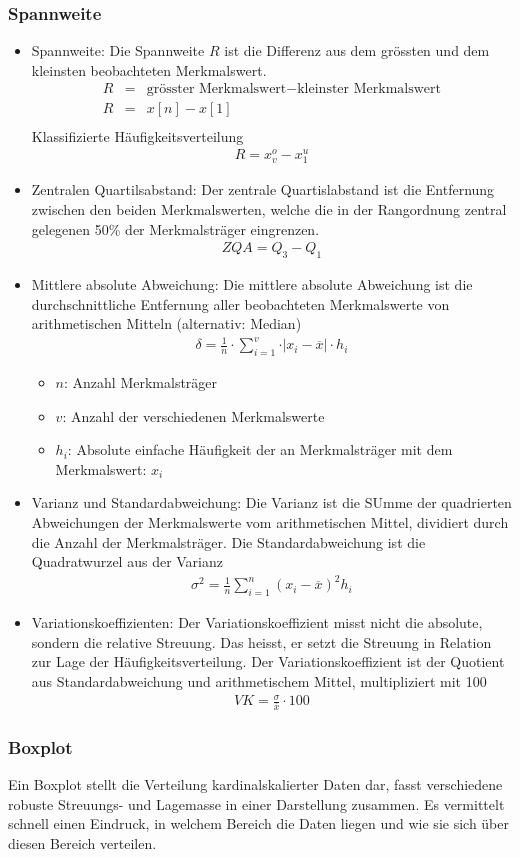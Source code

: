 \subsubsection{Spannweite}
\begin{itemize}
	\item Spannweite: Die Spannweite $R$ ist die Differenz aus dem grössten und dem kleinsten beobachteten Merkmalswert.
	\begin{eqnarray}
	R&=&\mbox{grösster Merkmalswert}-\mbox{kleinster Merkmalswert}\\
	R&=&x[n]-x[1]\\
	\end{eqnarray}
	Klassifizierte Häufigkeitsverteilung
	\begin{eqnarray}
	R=x_{v}^{o}-x_{1}^{u}
	\end{eqnarray}
	\item Zentralen Quartilsabstand: Der zentrale Quartislabstand ist die Entfernung zwischen den beiden Merkmalswerten, welche die in der Rangordnung zentral gelegenen 50\% der Merkmalsträger eingrenzen.
	\begin{eqnarray}
	ZQA=Q_3-Q_1
	\end{eqnarray}
	\item Mittlere absolute Abweichung: Die mittlere absolute Abweichung ist die durchschnittliche Entfernung aller beobachteten Merkmalswerte von arithmetischen Mitteln (alternativ: Median)
	\begin{eqnarray}
	\delta= \frac{1}{n}\cdot \sum_{i=1}^{v}\cdot \vert x_i - \overline{x} \vert \cdot h_i
	\end{eqnarray}
	\begin{itemize}
		\item $n$: Anzahl Merkmalsträger
		\item $v$: Anzahl der verschiedenen Merkmalswerte
		\item $h_i$: Absolute einfache Häufigkeit der an Merkmalsträger mit dem Merkmalswert: $x_i$
	\end{itemize}
	\item Varianz und Standardabweichung: Die Varianz ist die SUmme der quadrierten Abweichungen der Merkmalswerte vom arithmetischen Mittel, dividiert durch die Anzahl der Merkmalsträger. Die Standardabweichung ist die Quadratwurzel aus der Varianz
	\begin{eqnarray}
	\sigma^{2}=\frac{1}{n}\sum_{i=1}^{n}(x_i-\overline{x})^2 h_i
	\end{eqnarray}
	\item Variationskoeffizienten: Der Variationskoeffizient misst nicht die absolute, sondern die relative Streuung. Das heisst, er setzt die Streuung in Relation zur Lage der Häufigkeitsverteilung. Der Variationskoeffizient ist der Quotient aus Standardabweichung und arithmetischem Mittel, multipliziert mit 100
	\begin{eqnarray}
	VK=\frac{\sigma}{\overline{x}}\cdot 100
	\end{eqnarray}
\end{itemize}
\subsubsection{Boxplot}
Ein Boxplot stellt die Verteilung kardinalskalierter Daten dar, fasst verschiedene robuste Streuungs- und Lagemasse in einer Darstellung zusammen. Es vermittelt schnell einen Eindruck, in welchem Bereich die Daten liegen und wie sie sich über diesen Bereich verteilen.
